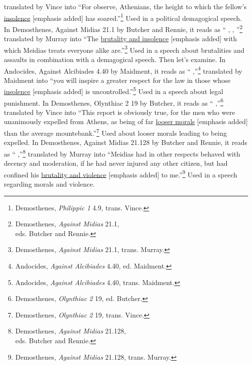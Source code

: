 translated by Vince into ``For observe, Athenians, the height to which the fellow's \underline{insolence} [emphasis added] has soared.''\footnote{Demosthenes, \emph{Philippic 1} 4.9, trans. Vince.} Used in a political demagogical speech. 
In Demosthenes, Against Midias 21.1 by Butcher and Rennie, it reads as `` \underline{}, , ''\footnote{Demosthenes, \emph{Against Midias} 21.1,\\eds. Butcher and Rennie.}
translated by Murray into ``The \underline{brutality and insolence} [emphasis added] with which Meidias treats everyone alike are.''\footnote{Demosthenes, \emph{Against Midias} 21.1, trans. Murray.} Used in a speech about brutalities and assaults in combination with a demagogical speech. 
Then let's examine.
In Andocides, Against Alcibiades 4.40 by Maidment, it reads as `` \underline{} ,''\footnote{Andocides, \emph{Against Alcibiades} 4.40, ed. Maidment.}
translated by Maidment into ``you will inspire a greater respect for the law in those whose \underline{insolence} [emphasis added] is uncontrolled.''\footnote{Andocides, \emph{Against Alcibiades} 4.40, trans. Maidment.} Used in a speech about legal punishment. 
In Demosthenes, Olynthiac 2 19 by Butcher, it reads as `` \underline{} ,''\footnote{Demosthenes, \emph{Olynthiac 2} 19, ed. Butcher.}
translated by Vince into ``This report is obviously true, for the men who were unanimously expelled from Athens, as being of far \underline{looser morals} [emphasis added] than the average mountebank.''\footnote{Demosthenes, \emph{Olynthiac 2} 19, trans. Vince.} Used about looser morals leading to being expelled. 
In Demosthenes, Against Midias 21.128 by Butcher and Rennie, it reads as `` \underline{} ,''\footnote{Demosthenes, \emph{Against Midias} 21.128,\\eds. Butcher and Rennie.}
translated by Murray into ``Meidias had in other respects behaved with decency and moderation, if he had never injured any other citizen, but had confined his \underline{brutality and violence} [emphasis added] to me.''\footnote{Demosthenes, \emph{Against Midias} 21.128, trans. Murray.} Used in a speech regarding morals and violence.
